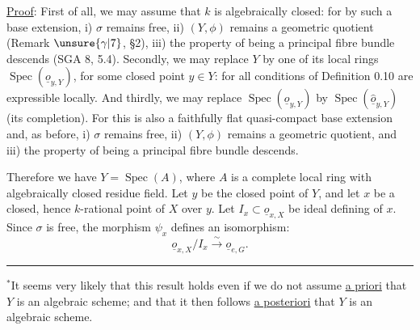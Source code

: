 
\uline{Proof}: First of all, we may assume that $k$ is algebraically closed: for by such a base extension, i) $\sigma$ remains free, ii) $(Y,\phi)$ remains a geometric quotient (Remark $\unsure{\gamma|7}$, \S2), iii) the property of being a principal fibre bundle descends (SGA 8, 5.4). Secondly, we may replace $Y$ by one of its local rings $\operatorname{Spec}(\underline{o}_{y,Y})$, for some closed point $y\in Y$: for all conditions of Definition 0.10 are expressible locally. And thirdly, we may replace $\operatorname{Spec}(\underline{o}_{y,Y})$ by $\operatorname{Spec}(\hat{\underline{o}}_{y,Y})$ (its completion). For this is also a faithfully flat quasi-compact base extension and, as before, i) $\sigma$ remains free, ii) $(Y,\phi)$ remains a geometric quotient, and iii) the property of being a principal fibre bundle descends.

Therefore we have $Y=\operatorname{Spec}(A)$, where $A$ is a complete local ring with algebraically closed residue field. Let $y$ be the closed point of $Y$, and let $x$ be a closed, hence $k$-rational point of $X$ over $y$. Let $I_x\subset\underline{o}_{x,X}$ be
ideal defining
of $x$. Since $\sigma$ is free, the morphism $\psi_x$ defines an isomorphism:
\[
\underline{o}_{x,X}/I_x\xrightarrow{\sim}\underline{o}_{e,G}.
\]

\noindent\rule{2cm}{.4pt}

${}^*$It seems very likely that this result holds even if we do not assume \uline{a priori} that $Y$ is an algebraic scheme; and that it then follows \uline{a posteriori} that $Y$ is an algebraic scheme.



